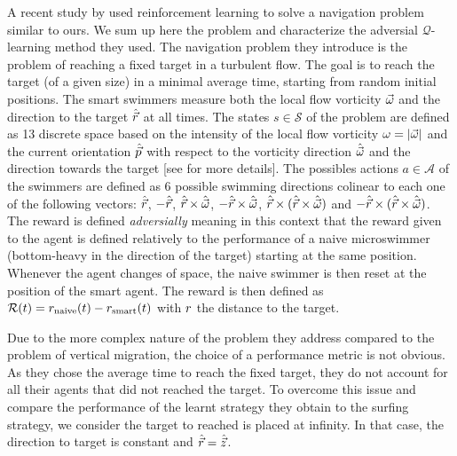 A recent study by \citet{Alageshan2020} used reinforcement learning to solve a navigation problem similar to ours.
We sum up here the problem and characterize the adversial $\mathcal{Q}$-learning method they used.
The navigation problem they introduce is the problem of reaching a fixed target in a turbulent flow.
The goal is to reach the target (of a given size) in a minimal average time, starting from random initial positions.
The smart swimmers measure both the local flow vorticity $\vec{\omega}$ and the direction to the target $\hat{\vec{r}}$ at all times.
The states $s \in \mathcal{S}$ of the problem are defined as 13 discrete space based on the intensity of the local flow vorticity $\omega = \lvert\vec{\omega}\rvert$ and the current orientation $\hat{\vec{p}}$ with respect to the vorticity direction $\hat{\vec{\omega}}$ and the direction towards the target [see \citet{alageshan2020machine} for more details].
The possibles actions $a \in \mathcal{A}$ of the swimmers are defined as 6 possible swimming directions colinear to each one of the following vectors: $\hat{\vec{r}}$, $-\hat{\vec{r}}$, $\hat{\vec{r}} \times \hat{\vec{\omega}}$, $-\hat{\vec{r}} \times \hat{\vec{\omega}}$, $\hat{\vec{r}} \times (\hat{\vec{r}} \times \hat{\vec{\omega}})$ and $-\hat{\vec{r}} \times (\hat{\vec{r}} \times \hat{\vec{\omega}})$.
The reward is defined \textit{adversially} meaning in this context that the reward given to the agent is defined relatively to the performance of a naive microswimmer (bottom-heavy in the direction of the target) starting at the same position.
Whenever the agent changes of space, the naive swimmer is then reset at the position of the smart agent.
The reward is then defined as $\mathcal{R}(t) = r_{\mathrm{naive}}(t) - r_{\mathrm{smart}}(t)$ with $r$ the distance to the target.

Due to the more complex nature of the problem they address compared to the problem of vertical migration, the choice of a performance metric is not obvious.
As they chose the average time to reach the fixed target, they do not account for all their agents that did not reached the target.
To overcome this issue and compare the performance of the learnt strategy they obtain to the surfing strategy, we consider the target to reached is placed at infinity.
In that case, the direction to target is constant and $\hat{\vec{r}} = \hat{\vec{z}}$.

